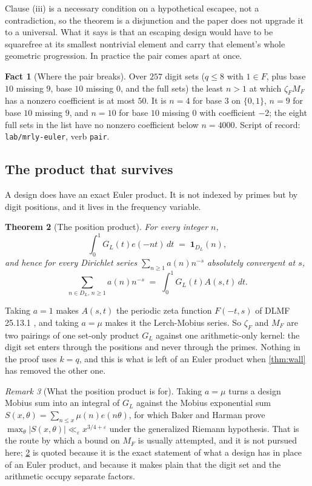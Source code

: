 \documentclass[11pt]{amsart}
\newtheorem{theorem}{Theorem}[section]
\theoremstyle{definition}
\newtheorem{fact}[theorem]{Fact}
\theoremstyle{remark}
\newtheorem{remark}[theorem]{Remark}
\begin{document}
Clause (iii) is a necessary condition on a hypothetical escapee, not a contradiction, so the theorem is a disjunction and the paper does not upgrade it to a universal. What it says is that an escaping design would have to be squarefree at its smallest nontrivial element and carry that element's whole geometric progression. In practice the pair comes apart at once.

\begin{fact}[Where the pair breaks]
\label{fact:pair}
Over $257$ digit sets ($q \le 8$ with $1 \in F$, plus base $10$ missing $9$, base $10$ missing $0$, and the full sets) the least $n > 1$ at which $\zeta_{F} M_{F}$ has a nonzero coefficient is at most $50$. It is $n = 4$ for base $3$ on $\{0,1\}$, $n = 9$ for base $10$ missing $9$, and $n = 10$ for base $10$ missing $0$ with coefficient $-2$; the eight full sets in the list have no nonzero coefficient below $n = 4000$. Script of record: \texttt{lab/mrly-euler}, verb \texttt{pair}.
\end{fact}

\subsection{The product that survives}
\label{sub:position}

A design does have an exact Euler product. It is not indexed by primes but by digit positions, and it lives in the frequency variable.

\begin{theorem}[The position product]
\label{thm:position}
For every integer $n$,
\[
  \int_{0}^{1} G_{L}(t) e(-nt)\,dt \;=\; \mathbf{1}_{D_{L}}(n),
\]
and hence for every Dirichlet series $\sum_{n \ge 1} a(n) n^{-s}$ absolutely convergent at $s$,
\[
  \sum_{n \in D_{L},\, n \ge 1} a(n) n^{-s} \;=\; \int_{0}^{1} G_{L}(t) A(s,t)\,dt .
\]
\end{theorem}

Taking $a = 1$ makes $A(s,t)$ the periodic zeta function $F(-t,s)$ of DLMF 25.13.1 \cite{dlmf}, and taking $a = \mu$ makes it the Lerch-Mobius series. So $\zeta_{F}$ and $M_{F}$ are two pairings of one set-only product $G_{L}$ against one arithmetic-only kernel: the digit set enters through the positions and never through the primes. Nothing in the proof uses $k = q$, and this is what is left of an Euler product when \cref{thm:wall} has removed the other one.

\begin{remark}[What the position product is for]
\label{rem:whyposition}
Taking $a = \mu$ turns a design Mobius sum into an integral of $G_{L}$ against the Mobius exponential sum $S(x,\theta) = \sum_{n \le x}\mu(n)e(n\theta)$, for which Baker and Harman \cite{bh91} prove $\max_{\theta}|S(x,\theta)| \ll_{\varepsilon} x^{3/4+\varepsilon}$ under the generalized Riemann hypothesis. That is the route by which a bound on $M_{F}$ is usually attempted, and it is not pursued here; \cref{thm:position} is quoted because it is the exact statement of what a design has in place of an Euler product, and because it makes plain that the digit set and the arithmetic occupy separate factors.
\end{remark}
\end{document}
